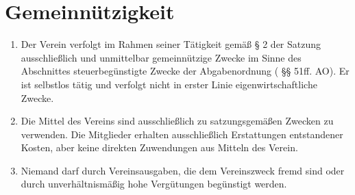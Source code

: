 \documentclass[fontsize=12pt,paper=a4,pagesize,headings=small]{scrartcl}
\begin{document}
\section{Gemeinnützigkeit}
\begin{enumerate}

    \item Der Verein verfolgt im Rahmen seiner Tätigkeit gemäß § 2 der
    Satzung ausschließlich und unmittelbar gemeinnützige Zwecke im
    Sinne des Abschnittes steuerbegünstigte Zwecke der Abgabenordnung
    ( §§ 51ff. AO). Er ist selbstlos tätig und verfolgt nicht in erster
    Linie eigenwirtschaftliche Zwecke.

    \item Die Mittel des Vereins sind ausschließlich zu satzungsgemäßen
    Zwecken zu verwenden. Die Mitglieder erhalten ausschließlich
    Erstattungen entstandener Kosten, aber keine direkten Zuwendungen
    aus Mitteln des Verein.

    \item Niemand darf durch Vereinsausgaben, die dem Vereinszweck
    fremd sind oder durch unverhältnismäßig hohe Vergütungen begünstigt
    werden.
\end{enumerate}
\end{document}
